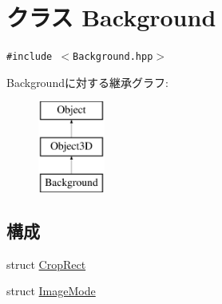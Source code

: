 \hypertarget{classm3g_1_1Background}{
\section{クラス Background}
\label{classm3g_1_1Background}
}
{\tt \#include $<$Background.hpp$>$}

Backgroundに対する継承グラフ:\begin{figure}[H]
\begin{center}
\leavevmode
\includegraphics[height=3cm]{classm3g_1_1Background}
\end{center}
\end{figure}
\subsection*{構成}
\begin{CompactItemize}
\item 
struct \hyperlink{structm3g_1_1Background_1_1CropRect}{CropRect}
\item 
struct \hyperlink{structm3g_1_1Background_1_1ImageMode}{ImageMode}
\end{CompactItemize}
